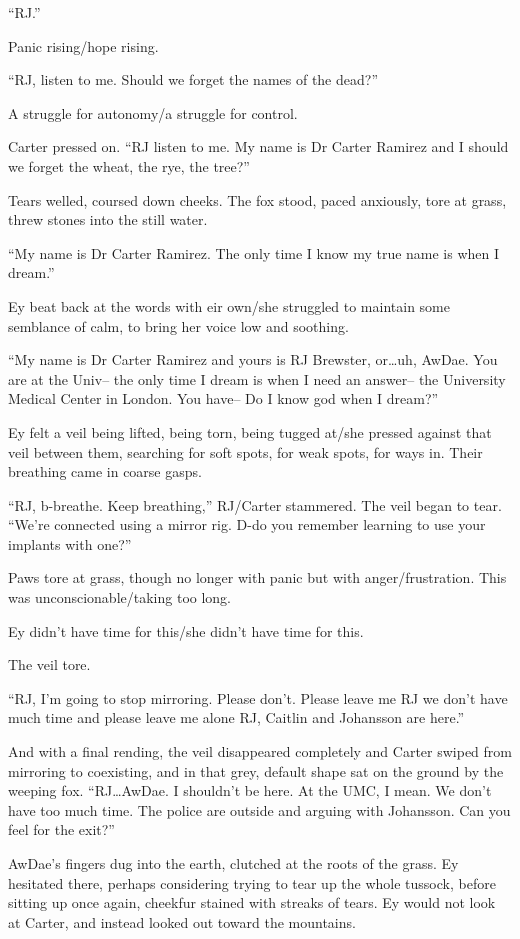 ``RJ.''

Panic rising/hope rising.

``RJ, listen to me. Should we forget the names of the dead?''

A struggle for autonomy/a struggle for control.

Carter pressed on. ``RJ listen to me. My name is Dr Carter Ramirez and I should we forget the wheat, the rye, the tree?''

Tears welled, coursed down cheeks. The fox stood, paced anxiously, tore at grass, threw stones into the still water.

``My name is Dr Carter Ramirez. The only time I know my true name is when I dream.''

Ey beat back at the words with eir own/she struggled to maintain some semblance of calm, to bring her voice low and soothing.

``My name is Dr Carter Ramirez and yours is RJ Brewster, or\ldots{}uh, AwDae. You are at the Univ-- the only time I dream is when I need an answer-- the University Medical Center in London. You have-- Do I know god when I dream?''

Ey felt a veil being lifted, being torn, being tugged at/she pressed against that veil between them, searching for soft spots, for weak spots, for ways in. Their breathing came in coarse gasps.

``RJ, b-breathe. Keep breathing,'' RJ/Carter stammered. The veil began to tear. ``We're connected using a mirror rig. D-do you remember learning to use your implants with one?''

Paws tore at grass, though no longer with panic but with anger/frustration. This was unconscionable/taking too long.

Ey didn't have time for this/she didn't have time for this.

The veil tore.

``RJ, I'm going to stop mirroring. Please don't. Please leave me RJ we don't have much time and please leave me alone RJ, Caitlin and Johansson are here.''

And with a final rending, the veil disappeared completely and Carter swiped from mirroring to coexisting, and in that grey, default shape sat on the ground by the weeping fox. ``RJ\ldots{}AwDae. I shouldn't be here. At the UMC, I mean. We don't have too much time. The police are outside and arguing with Johansson. Can you feel for the exit?''

AwDae's fingers dug into the earth, clutched at the roots of the grass. Ey hesitated there, perhaps considering trying to tear up the whole tussock, before sitting up once again, cheekfur stained with streaks of tears. Ey would not look at Carter, and instead looked out toward the mountains.

